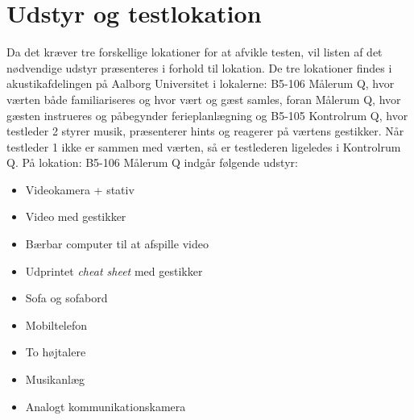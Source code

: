 \section{Udstyr og testlokation}
\label{UdstyrLokationSocialAccept}
%
Da det kræver tre forskellige lokationer for at afvikle testen, vil listen af det nødvendige udstyr præsenteres i forhold til lokation. De tre lokationer findes i akustikafdelingen på Aalborg Universitet i lokalerne: B5-106 Målerum Q, hvor værten både familiariseres og hvor vært og gæst samles, foran Målerum Q, hvor gæsten instrueres og påbegynder ferieplanlægning og B5-105 Kontrolrum Q, hvor testleder 2 styrer musik, præsenterer hints og reagerer på værtens gestikker. Når testleder 1 ikke er sammen med værten, så er testlederen ligeledes i Kontrolrum Q. \blankline
%
På lokation: B5-106 Målerum Q indgår følgende udstyr: 
\begin{itemize}
\item Videokamera + stativ
\item Video med gestikker
\item Bærbar computer til at afspille video
\item Udprintet \textit{cheat sheet} med gestikker
\item Sofa og sofabord
\item Mobiltelefon
\item To højtalere 
\item Musikanlæg
\item Analogt kommunikationskamera\blankline
\noindent
\end{itemize}
%
